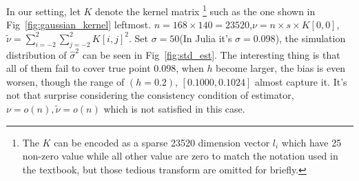 \documentclass{article}
\begin{document}
In our setting, let $K$ denote the kernel matrix
\footnote{The $K$ can be encoded as a sparse 23520 dimension vector $l_i$ which have 25 non-zero value while all other value are zero to match
the notation used in the textbook, but those tedious transform are omitted for briefly.}
such as the one shown in Fig~\ref{fig:gaussian_kernel} leftmost.
$n = 168 \times 140 = 23520$,$\nu = n \times s \times K[0,0]$,
$\tilde{\nu} = \sum_{i=-2}^2\sum_{j=-2}^2 K[i,j]^2$. 
Set $\sigma=50$(In Julia it's $\sigma=0.098$), 
the simulation distribution of $\hat{\sigma}^2$ can be seen in Fig~\ref{fig:std_est}. 
The interesting thing is that all of them fail to cover true point $0.098$, when $h$ become larger,
the bias is even worsen, though the range of $(h=0.2)$, $[0.1000,0.1024]$ almost capture it.
It's not that surprise considering the consistency condition of estimator, 
$\nu=o(n),\tilde{\nu}=o(n)$ which is not satisfied in this case.
\end{document}
